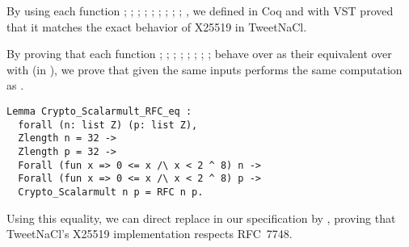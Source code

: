
\begin{sloppypar}
      By using each function ; ; ; ;
      ; ; ; ; ;
      , we defined  in Coq and with VST
      proved that it matches the exact behavior of X25519 in TweetNaCl.
\end{sloppypar}

\begin{sloppypar}
      By proving that each function ; ; ;
      ; ; ; ;
      ;  behave over  as their equivalent
      over  with  (in \Zfield), we prove that given the same inputs
       performs the same computation as .
\end{sloppypar}

\begin{lstlisting}[language=Coq]
Lemma Crypto_Scalarmult_RFC_eq :
  forall (n: list Z) (p: list Z),
  Zlength n = 32 ->
  Zlength p = 32 ->
  Forall (fun x => 0 <= x /\ x < 2 ^ 8) n ->
  Forall (fun x => 0 <= x /\ x < 2 ^ 8) p ->
  Crypto_Scalarmult n p = RFC n p.
\end{lstlisting}

Using this equality, we can direct replace  in our
specification by , proving that TweetNaCl's X25519 implementation
respects RFC~7748.




